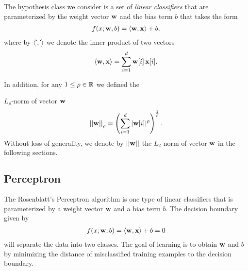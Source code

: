 The hypothesis class we consider is a set of \textit{linear classifiers} that are parameterized by the weight vector $\mathbf {w}$ and the bias term $b$ that takes the form
\begin{align}
	f(x;\mathbf {w},b) = \langle \mathbf {w}, \mathbf {x} \rangle + b, \label{linearclassifier}
\end{align}
where by $\langle \dot\,, \dot\, \rangle$ we denote the inner product of two vectors
\begin{align*}
	\langle \mathbf {w}, \mathbf {x} \rangle = \sum_{i=1}^{d}\mathbf {w}[i]\,\mathbf {x}[i].
\end{align*}

In addition, for any $1\le\rho\in\mathbb{R}$ we defined the {$L_{\rho}$-norm of vector $\mathbf {w}$ 
\begin{align*}
	\left|\left| \mathbf {w} \right|\right|_{\rho} = \left(\sum_{i=1}^{d}|\mathbf {w}[i]|^{\rho}\right)^{\frac{1}{\rho}}.
\end{align*}
Without loss of generality, we denote by $||\mathbf {w}||$ the $L_2$-norm of vector $\mathbf {w}$ in the following sections.


%
%
\subsection{Perceptron}\label{sc_perceptron}

The Rosenblatt's Perceptron algorithm \citep{Rosenblatt58,Rosenblatt62} is one type of linear classifiers that is parameterized by a weight vector $\mathbf {w}$ and a bias term $b$. 
The decision boundary given by 
\begin{align*}
	f(x;\mathbf {w},b) = \langle \mathbf {w}, \mathbf {x} \rangle + b =0
\end{align*}
will separate the data into two classes.
The goal of learning is to obtain $\mathbf {w}$ and $b$ by minimizing the distance of misclassified training examples to the decision boundary.

}
